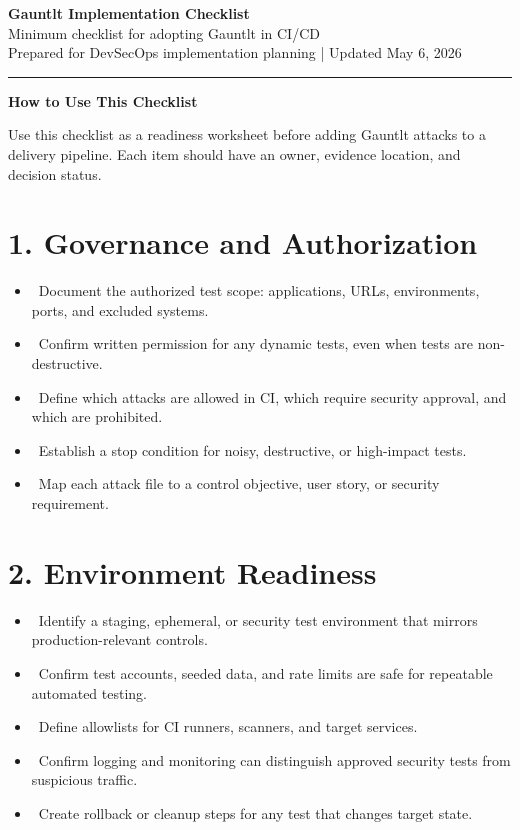 \documentclass[11pt]{article}
\newcommand{\TitleBlock}[2]{%
  \begin{center}
  {\LARGE\bfseries\color{HeaderBlue} #1}\\[0.35em]
  {\large #2}\\[0.4em]
  {\small Prepared for DevSecOps implementation planning | Updated May 6, 2026}
  \end{center}
  \vspace{0.4em}\hrule\vspace{0.8em}
}
\newenvironment{Callout}[1]{%
  \par\vspace{0.3em}\noindent\begin{lrbox}{\gauntltbox}\begin{minipage}{0.96\linewidth}\textbf{#1}\par\smallskip}
  {\end{minipage}\end{lrbox}\fcolorbox{RuleGray}{LightBlue}{\usebox{\gauntltbox}}\par\vspace{0.4em}}
\newcommand{\checkbox}{\raisebox{0.2ex}{\fbox{\rule{0pt}{0.9ex}\rule{0.9ex}{0pt}}}}
\begin{document}
\TitleBlock{Gauntlt Implementation Checklist}{Minimum checklist for adopting Gauntlt in CI/CD}

\begin{Callout}{How to Use This Checklist}
Use this checklist as a readiness worksheet before adding Gauntlt attacks to a delivery pipeline. Each item should have an owner, evidence location, and decision status.
\end{Callout}

\section{1. Governance and Authorization}
\begin{itemize}
  \item \checkbox\ Document the authorized test scope: applications, URLs, environments, ports, and excluded systems.
  \item \checkbox\ Confirm written permission for any dynamic tests, even when tests are non-destructive.
  \item \checkbox\ Define which attacks are allowed in CI, which require security approval, and which are prohibited.
  \item \checkbox\ Establish a stop condition for noisy, destructive, or high-impact tests.
  \item \checkbox\ Map each attack file to a control objective, user story, or security requirement.
\end{itemize}

\section{2. Environment Readiness}
\begin{itemize}
  \item \checkbox\ Identify a staging, ephemeral, or security test environment that mirrors production-relevant controls.
  \item \checkbox\ Confirm test accounts, seeded data, and rate limits are safe for repeatable automated testing.
  \item \checkbox\ Define allowlists for CI runners, scanners, and target services.
  \item \checkbox\ Confirm logging and monitoring can distinguish approved security tests from suspicious traffic.
  \item \checkbox\ Create rollback or cleanup steps for any test that changes target state.
\end{itemize}
\end{document}
